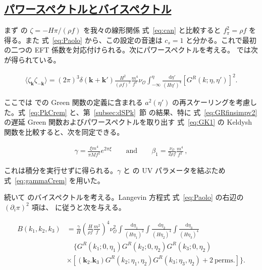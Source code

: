\documentclass[a4paper,11pt]{ltjsarticle}
\newcommand{\subsectionlink}[1]{\subsection[#1]{\hyperlink{toc}{#1}}}
\numberwithin{equation}{section}
\newcommand{\dd}{\mathrm{d}}
\newcommand{\ee}{e}
\newcommand{\boldmathsymbol}[1]{{\ensuremath{\boldsymbol{#1}}}}
\newcommand{\bmk}{\boldmathsymbol{k}}
\newcommand{\Eq}[1]{Eq.~(\ref{#1})}
\newcommand{\Sec}[1]{Sec.~\ref{#1}}
\def\bmk{{\boldsymbol{k}}}
\renewcommand{\Eq}[1]{式~\eqref{#1}}
\renewcommand{\Sec}[1]{第~\ref{#1}~節}
\begin{document}
\subsectionlink{パワースペクトルとバイスペクトル}\label{subsec:obs}

まず \cite{Creminelli:2023aly} の $\zeta=-H\pi/(\rho f)$ を我々の線形関係 \Eq{eq:can} と比較すると $f_\pi^2=\rho f$ を得る。また \Eq{eq:Paolo} から、この設定の音速は $c_s=1$ と分かる。これで最初の二つの EFT 係数を対応付けられる。次にパワースペクトルを考える。\cite{Creminelli:2023aly} では次が得られている。

\begin{align}\label{eq:PkCrem}
    \langle \zeta_\bmk \zeta_{-\bmk}\rangle = (2\pi)^3 \delta(\bmk + \bmk') \frac{H^2}{\left(\rho f\right)^2} \frac{m^4}{f^2} \nu_{\mathcal{O}} \int_{-\infty}^{\eta} \frac{\dd \eta'}{\left(H\eta'\right)^{4}} \left[ G^R(k; \eta,\eta') \right]^2.
\end{align}

ここでは \cite{Creminelli:2023aly} での Green 関数の定義に含まれる $a^2(\eta')$ の再スケーリングを考慮した。\Eq{eq:PkCrem} と、\Sec{subsec:dSPk} の結果、特に \Eq{eq:GRfinsimpv2} の遅延 Green 関数およびパワースペクトルを取り出す \Eq{eq:GK1} の Keldysh 関数を比較すると、次を同定できる。

\begin{align}\label{eq:match1}
    \gamma = \frac{\xi m^4}{\pi M f^2} \ee^{2 \pi \xi} \qquad \mathrm{and} \qquad \beta_1 = \frac{\nu_{\mathcal{O}}}{2 \rho f} \frac{m^4}{f^2}\,,
\end{align}

これは積分を実行せずに得られる。$\gamma$ と \cite{Creminelli:2023aly} の UV パラメータを結ぶため \Eq{eq:gammaCrem} を用いた。

続いて \cite{Creminelli:2023aly} のバイスペクトルを考える。Langevin 方程式 \Eq{eq:Paolo} の右辺の $(\partial_i\pi)^2$ 項は、\cite{Creminelli:2023aly} に従うと次を与える。

\begin{align}\label{eq:bispecCrem}
     B(k_1,k_2,k_3) &= \frac{\gamma}{H} \left(\frac{H}{\rho f} \frac{m^2}{f} \right)^4 \nu_\mathcal{O}^2  \int \frac{\dd \eta_1}{\left(H\eta_1\right)^{2}} \int \frac{\dd \eta_2}{\left(H\eta_2\right)^{4}}  \int \frac{\dd \eta_3} {\left(H\eta_3\right)^{4}}   \nonumber\\
    & \quad \bigg\{G^R(k_1; 0,\eta_1) G^R(k_2; 0,\eta_2) G^R(k_3; 0,\eta_2) \\
    &\times\left[ \left(\bmk_2.\bmk_3\right) G^R(k_2; \eta_1,\eta_2)  G^R(k_3; \eta_3,\eta_2)+ 2~\mathrm{perms.} \right] \bigg\} .  \nonumber
\end{align}
\end{document}
